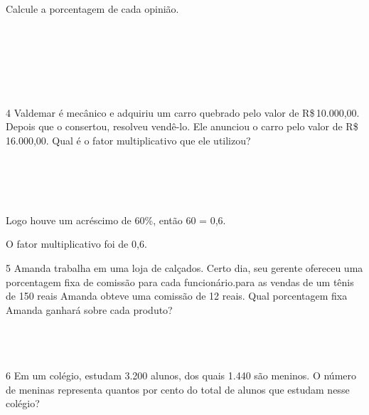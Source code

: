 Calcule a porcentagem de cada opinião.

\\
\\
\\
\\
\\

\num{4} Valdemar é mecânico e adquiriu um carro quebrado pelo valor de
R\$\,10.000,00. Depois que o consertou, resolveu vendê-lo. Ele anunciou o
carro pelo valor de R\$\,16.000,00. Qual é o fator multiplicativo que ele
utilizou?

\\
\\
\\
\\

Logo houve um acréscimo de 60\%, então 60  = 0,6.

O fator multiplicativo foi de 0,6.

\num{5} Amanda trabalha em uma loja de calçados. Certo dia, seu gerente
ofereceu uma porcentagem fixa de comissão para cada funcionário.para as vendas de
um tênis de 150 reais Amanda obteve uma comissão de 12 reais. Qual porcentagem
fixa Amanda ganhará sobre cada produto?

\\
\\
\\

\num{6} Em um colégio, estudam 3.200 alunos, dos quais 1.440 são meninos. O
número de meninas representa quantos por cento do total de alunos que estudam
nesse colégio?

\\
\\
\\

